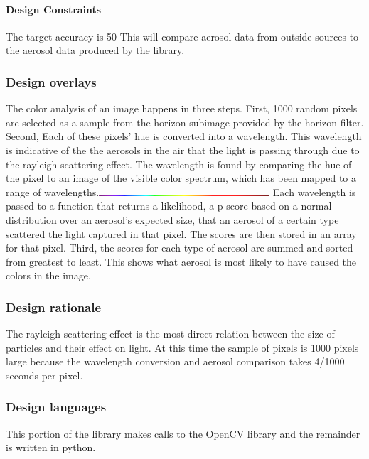 \documentclass[onecolumn, draftclsnofoot,10pt, compsoc]{IEEEtran}
\begin{document}
\begin{singlespace}
          \paragraph{Design Constraints}
			The target accuracy is 50%
			This will compare aerosol data from outside sources to the aerosol data produced by the library.
      \subsubsection{Design overlays}
		The color analysis of an image happens in three steps.
		First, 1000 random pixels are selected as a sample from the horizon subimage provided by the horizon filter.
		Second, Each of these pixels' hue is converted into a wavelength.
		This wavelength is indicative of the the aerosols in the air that the light is passing through due to the rayleigh scattering effect.
		The wavelength is found by comparing the hue of the pixel to an image of the visible color spectrum, which has been mapped to a range of wavelengths.\includegraphics[width=2.5in,natwidth=400,natheight=1]{images/Spectrum1pixel.png}
		Each wavelength is passed to a function that returns a likelihood, a p-score based on a normal distribution over an aerosol's expected size, that an aerosol of a certain type scattered the light captured in that pixel.
		The scores are then stored in an array for that pixel.
		Third, the scores for each type of aerosol are summed and sorted from greatest to least.
		This shows what aerosol is most likely to have caused the colors in the image.
      \subsubsection{Design rationale}
		The rayleigh scattering effect is the most direct relation between the size of particles and their effect on light.
		At this time the sample of pixels is 1000 pixels large because the wavelength conversion and aerosol comparison takes 4/1000 seconds per pixel.
      \subsubsection{Design languages}
		This portion of the library makes calls to the OpenCV library and the remainder is written in python.

\end{singlespace}
\end{document}
